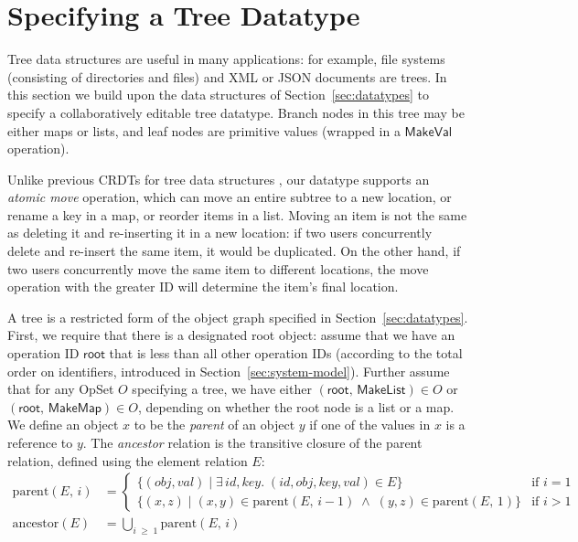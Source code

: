 \section{Specifying a Tree Datatype}\label{sec:tree}

Tree data structures are useful in many applications: for example, file systems (consisting of directories and files) and XML or JSON documents are trees.
In this section we build upon the data structures of Section~\ref{sec:datatypes} to specify a collaboratively editable tree datatype.
Branch nodes in this tree may be either maps or lists, and leaf nodes are primitive values (wrapped in a $\mathsf{MakeVal}$ operation).

Unlike previous CRDTs for tree data structures \cite{Martin:2010ih,Kleppmann:2016ve}, our datatype supports an \emph{atomic move} operation, which can move an entire subtree to a new location, or rename a key in a map, or reorder items in a list.
Moving an item is not the same as deleting it and re-inserting it in a new location: if two users concurrently delete and re-insert the same item, it would be duplicated.
On the other hand, if two users concurrently move the same item to different locations, the move operation with the greater ID will determine the item's final location.

A tree is a restricted form of the object graph specified in Section~\ref{sec:datatypes}.
First, we require that there is a designated root object: assume that we have an operation ID $\mathsf{root}$ that is less than all other operation IDs (according to the total order on identifiers, introduced in Section~\ref{sec:system-model}).
Further assume that for any OpSet $O$ specifying a tree, we have either $(\mathsf{root},\, \mathsf{MakeList}) \in O$ or $(\mathsf{root},\, \mathsf{MakeMap}) \in O$, depending on whether the root node is a list or a map.
We define an object $x$ to be the \emph{parent} of an object $y$ if one of the values in $x$ is a reference to $y$.
The \emph{ancestor} relation is the transitive closure of the parent relation, defined using the element relation $E$:
\begin{align*}
    \mathrm{parent}(E,\, i) &=
    \begin{cases}
        \big\{ (\mathit{obj}, \mathit{val}) \mid \exists\,\mathit{id}, \mathit{key}.\;
            (\mathit{id}, \mathit{obj}, \mathit{key}, \mathit{val}) \in E \big\} & \text{if } i=1 \\
        \big\{ (x, z) \mid (x, y) \in \mathrm{parent}(E,\, i-1) \;\wedge\;
            (y, z) \in \mathrm{parent}(E,\, 1) \big\} & \text{if } i > 1
    \end{cases} \\[8pt]
    \mathrm{ancestor}(E) &= \bigcup_{i \;\geq\; 1} \mathrm{parent}(E,\, i)
\end{align*}

